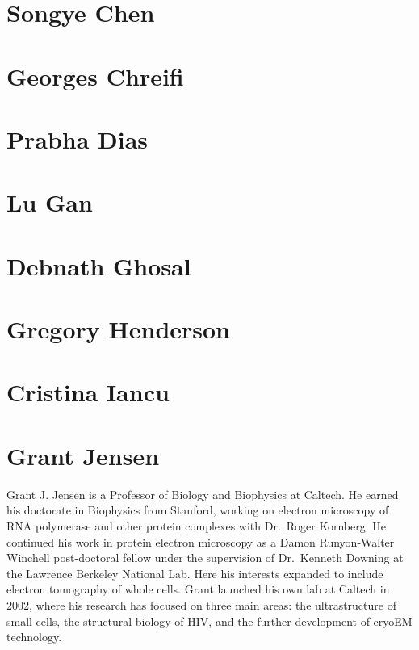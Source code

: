\documentclass[]{tufte-book}
\begin{document}
\hypertarget{songye_chen}{\section*{Songye Chen}\label{songye_chen}}

\hypertarget{georges_chreifi}{\section*{Georges
Chreifi}\label{georges_chreifi}}

\hypertarget{prabha_dias}{\section*{Prabha Dias}\label{prabha_dias}}

\hypertarget{lu_gan}{\section*{Lu Gan}\label{lu_gan}}

\hypertarget{debnath_ghosal}{\section*{Debnath
Ghosal}\label{debnath_ghosal}}

\hypertarget{gregory_henderson}{\section*{Gregory
Henderson}\label{gregory_henderson}}

\hypertarget{cristina_iancu}{\section*{Cristina
Iancu}\label{cristina_iancu}}

\section*{Grant Jensen}\label{grant_jensen}

Grant J. Jensen is a Professor of Biology and Biophysics at Caltech. He
earned his doctorate in Biophysics from Stanford, working on electron
microscopy of RNA polymerase and other protein complexes with Dr.~Roger
Kornberg. He continued his work in protein electron microscopy as a
Damon Runyon-Walter Winchell post-doctoral fellow under the supervision
of Dr.~Kenneth Downing at the Lawrence Berkeley National Lab. Here his
interests expanded to include electron tomography of whole cells. Grant
launched his own lab at Caltech in 2002, where his research has focused
on three main areas: the ultrastructure of small cells, the structural
biology of HIV, and the further development of cryoEM technology.
\end{document}
